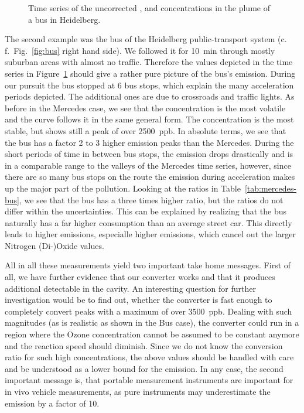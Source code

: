\begin{figure}[htbp]
  \centering
  
  \caption{Time series of the uncorrected ,  and 
    concentrations in the plume of a bus in Heidelberg.}
  \label{fig:bus-ts}
\end{figure}

The second example was the bus of the Heidelberg public-transport
system (c.\,f.\ Fig.~\ref{fig:bus} right hand side). We followed it
for \SI{10}{\minute} through mostly suburban
areas with almost no traffic. Therefore the values depicted in the
time series in Figure~\ref{fig:bus-ts} should give a rather pure
picture of the bus's emission. During our pursuit the bus stopped at 6
bus stops, which explain the many acceleration periods depicted. The
additional ones are due to crossroads and traffic
lights. As before in the Mercedes case, we see that the 
concentration is the most volatile and the  curve follows it
in the same general form. The  concentration is the most
stable, but shows still a peak of over \SI{2500}{ppb}. In absolute
terms, we see that the bus has a factor 2 to 3 higher 
emission peaks than the Mercedes. During the short periods of time in
between bus stops, the emission drops drastically and is in a
comparable range to the valleys of the Mercedes time series, however,
since there are so many bus stops on the route the emission during
acceleration makes up the major part of the pollution. Looking at the
ratios in Table~\ref{tab:mercedes-bus}, we see that the bus has a
three times higher  ratio, but the  ratios do not
differ within the uncertainties. This can be explained by realizing
that the bus naturally has a far higher consumption than an average
street car. This directly leads to higher emissions, especialle higher
 emissions, which cancel out the larger Nitrogen (Di-)Oxide
values.

All in all these measurements yield two important take home
messages. First of all, we have further evidence that our converter
works and that it produces additional detectable  in
the cavity. An interesting question for further investigation would be
to find out, whether the converter is fast enough to completely
convert  peaks with a maximum of over \SI{3500}{ppb}. Dealing
with such magnitudes (as is realistic as shown in the Bus case), the
converter could run in a region where the Ozone concentration cannot
be assumed to be constant anymore and the reaction speed should
diminish. Since we do not know the conversion ratio for such high
concentrations, the above  values should be handled with care
and be understood as a lower bound for the emission. In any case, the
second important message is, that portable  measurement
instruments are important for in vivo vehicle measurements, as pure
 instruments may underestimate the  emission by a
factor of 10.

